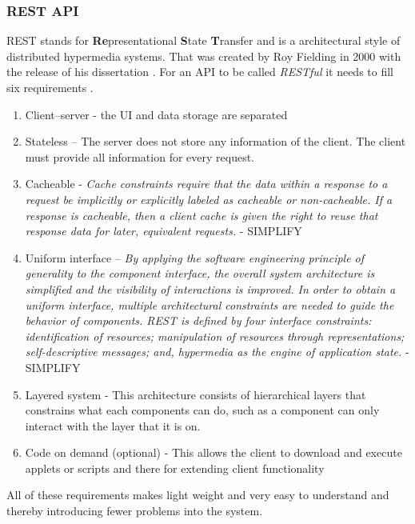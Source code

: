 \subsubsection{REST API}%
\label{sub:REST API}
REST stands for \textbf{Re}presentational \textbf{S}tate \textbf{T}ransfer and is a architectural style of distributed hypermedia systems. That was created by Roy Fielding in 2000 with the release of his dissertation \cite{fieldingFieldingDissertationCHAPTER}. For an API to be called \textit{RESTful} it needs to fill six requirements \cite{restfulapi.netWhatREST}.
\begin{enumerate}
  \item Client–server - the UI and data storage are separated
  \item Stateless –  The server does not store any information of the client. The client must provide all information for every request. 
  \item Cacheable - \textit{Cache constraints require that the data within a response to a request be implicitly or explicitly labeled as cacheable or non-cacheable. If a response is cacheable, then a client cache is given the right to reuse that response data for later, equivalent requests.} - SIMPLIFY
  \item Uniform interface – \textit{By applying the software engineering principle of generality to the component interface, the overall system architecture is simplified and the visibility of interactions is improved. In order to obtain a uniform interface, multiple architectural constraints are needed to guide the behavior of components. REST is defined by four interface constraints: identification of resources; manipulation of resources through representations; self-descriptive messages; and, hypermedia as the engine of application state.} - SIMPLIFY
  \item Layered system -  This architecture consists of hierarchical layers that constrains what each components can do, such as a component can only interact with the layer that it is on.
  \item  Code on demand (optional) - This allows the client to download and execute applets or scripts and there for extending client functionality
\end{enumerate}


 
All of these requirements makes light weight and very easy to understand and thereby introducing fewer problems into the system.  


